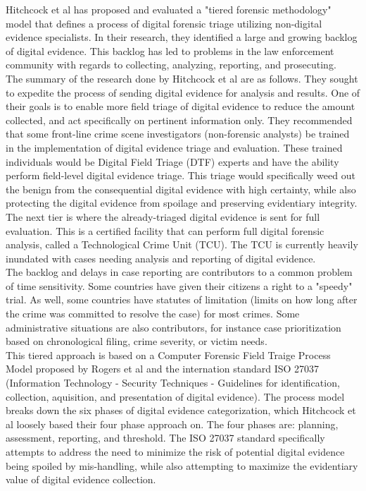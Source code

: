\documentclass[12pt]{article}
\begin{document}
Hitchcock et al\cite{hitchcock2016tiered} has proposed and evaluated a "tiered forensic methodology" model that defines
a process of digital forensic triage utilizing non-digital evidence specialists.  In their research, they identified
a large and growing backlog of digital evidence.  This backlog has led to problems in the law enforcement community
with regards to collecting, analyzing, reporting, and prosecuting.\\

The summary of the research done by Hitchcock et al\cite{hitchcock2016tiered} are as follows.  They sought to expedite
the process of sending digital evidence for analysis and results.  One of their goals is to enable more field triage
of digital evidence to reduce the amount collected, and act specifically on pertinent information only.  They 
recommended that some front-line crime scene investigators (non-forensic analysts) be trained in the implementation
of digital evidence triage and evaluation.  These trained individuals would be Digital Field Triage (DTF) experts and
have the ability perform field-level digital evidence triage.  This triage would specifically weed out the benign
from the consequential digital evidence with high certainty, while also protecting the digital evidence from spoilage
and preserving evidentiary integrity.\\

The next tier is where the already-triaged digital evidence is sent for full evaluation.  This is a certified facility
that can perform full digital forensic analysis, called a Technological Crime Unit (TCU).  The TCU is currently
heavily inundated with cases needing analysis and reporting of digital evidence.\\

The backlog and delays in case reporting are contributors to a common problem of time sensitivity.  Some countries 
have given their citizens a right to a "speedy" trial.  As well, some countries have statutes of limitation (limits
on how long after the crime was committed to resolve the case) for most crimes.  Some administrative situations are
also contributors, for instance case prioritization based on chronological filing, crime severity, or victim needs.\\

This tiered approach is based on a Computer Forensic Field Traige Process Model proposed by Rogers et al
\cite{rogers2006computer} and the internation standard ISO 27037 (Information Technology - Security Techniques - 
Guidelines for identification, collection, aquisition, and presentation of digital evidence). The process model 
breaks down the six phases of digital evidence categorization, which Hitchcock et al\cite{hitchcock2016tiered} loosely
based their four phase approach on.  The four phases are: planning, assessment, reporting, and threshold.  The ISO
27037 standard specifically attempts to address the need to minimize the risk of potential digital evidence being
spoiled by mis-handling, while also attempting to maximize the evidentiary value of digital evidence collection.\\
\end{document}
